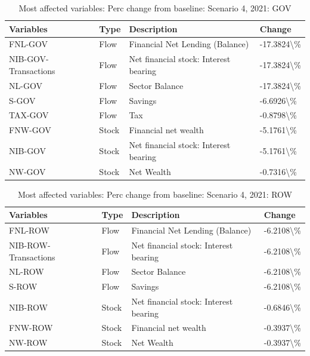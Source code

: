 \documentclass[
]{book}
\begin{document}
\begin{table}

\caption{\label{tab:most-affected-Scenario-4-perc-GOV}Most affected variables: Perc change from baseline: Scenario 4, 2021: GOV}
\centering
\fontsize{10}{12}\selectfont
\begin{tabular}[t]{l|l|l|l}
\hline
Variables & Type & Description & Change\\
\hline
FNL-GOV & Flow & Financial Net Lending (Balance) & -17.3824\textbackslash{}\%\\
\hline
NIB-GOV-Transactions & Flow & Net financial stock: Interest bearing & -17.3824\textbackslash{}\%\\
\hline
NL-GOV & Flow & Sector Balance & -17.3824\textbackslash{}\%\\
\hline
S-GOV & Flow & Savings & -6.6926\textbackslash{}\%\\
\hline
TAX-GOV & Flow & Tax & -0.8798\textbackslash{}\%\\
\hline
FNW-GOV & Stock & Financial net wealth & -5.1761\textbackslash{}\%\\
\hline
NIB-GOV & Stock & Net financial stock: Interest bearing & -5.1761\textbackslash{}\%\\
\hline
NW-GOV & Stock & Net Wealth & -0.7316\textbackslash{}\%\\
\hline
\end{tabular}
\end{table}

\begin{table}

\caption{\label{tab:most-affected-Scenario-4-perc-ROW}Most affected variables: Perc change from baseline: Scenario 4, 2021: ROW}
\centering
\fontsize{10}{12}\selectfont
\begin{tabular}[t]{l|l|l|l}
\hline
Variables & Type & Description & Change\\
\hline
FNL-ROW & Flow & Financial Net Lending (Balance) & -6.2108\textbackslash{}\%\\
\hline
NIB-ROW-Transactions & Flow & Net financial stock: Interest bearing & -6.2108\textbackslash{}\%\\
\hline
NL-ROW & Flow & Sector Balance & -6.2108\textbackslash{}\%\\
\hline
S-ROW & Flow & Savings & -6.2108\textbackslash{}\%\\
\hline
NIB-ROW & Stock & Net financial stock: Interest bearing & -0.6846\textbackslash{}\%\\
\hline
FNW-ROW & Stock & Financial net wealth & -0.3937\textbackslash{}\%\\
\hline
NW-ROW & Stock & Net Wealth & -0.3937\textbackslash{}\%\\
\hline
\end{tabular}
\end{table}
\end{document}
